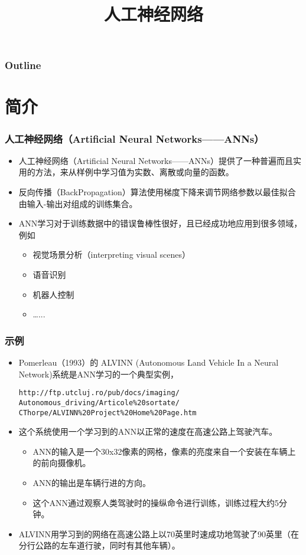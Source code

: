 \documentclass{beamer}
\title{人工神经网络}
\author{}
\date{}
\begin{document}
\maketitle

\begin{frame}
\frametitle{Outline}
\setcounter{tocdepth}{3}
\tableofcontents
\end{frame}












\section{简介}
\label{sec-1}
\begin{frame}
\frametitle{人工神经网络（Artificial Neural Networks——ANNs）}
\label{sec-1-1}


\begin{itemize}
\item 人工神经网络（Artificial Neural Networks——ANNs）提供了一种普遍而且实用的方法，来从样例中学习值为实数、离散或向量的函数。
\item 反向传播（BackPropagation）算法使用梯度下降来调节网络参数以最佳拟合由输入-输出对组成的训练集合。
\item ANN学习对于训练数据中的错误鲁棒性很好，且已经成功地应用到很多领域，例如
\begin{itemize}
\item 视觉场景分析（interpreting visual scenes）
\item 语音识别
\item 机器人控制
\item \ldots{}...
\end{itemize}
\end{itemize}
\end{frame}
\begin{frame}[fragile]
\frametitle{示例}
\label{sec-1-2}


\begin{itemize}
\item Pomerleau（1993）的 ALVINN (Autonomous Land Vehicle In a Neural Network)系统是ANN学习的一个典型实例，

\begin{verbatim}
http://ftp.utcluj.ro/pub/docs/imaging/
Autonomous_driving/Articole%20sortate/
CThorpe/ALVINN%20Project%20Home%20Page.htm
\end{verbatim}
\item 这个系统使用一个学习到的ANN以正常的速度在高速公路上驾驶汽车。
\begin{itemize}
\item ANN的输入是一个30x32像素的网格，像素的亮度来自一个安装在车辆上的前向摄像机。
\item ANN的输出是车辆行进的方向。
\item 这个ANN通过观察人类驾驶时的操纵命令进行训练，训练过程大约5分钟。
\end{itemize}
\item ALVINN用学习到的网络在高速公路上以70英里时速成功地驾驶了90英里（在分行公路的左车道行驶，同时有其他车辆）。
\end{itemize}
\end{frame}
\end{document}
